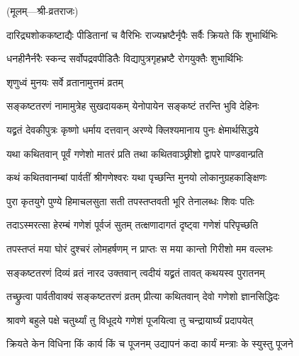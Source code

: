 \centerline{\small{(मूलम्—श्री-व्रतराजः)}}


\twolineshloka
{दारिद्र्यशोककष्टाद्यैः पीडितानां च वैरिभिः}
{राज्यभ्रष्टैर्नृपैः सर्वैः क्रियते किं शुभार्थिभिः} %


\twolineshloka
{धनहीनैर्नरैः स्कन्द सर्वोपद्रवपीडितैः}
{विद्यापुत्रगृहभ्रष्टै रोगयुक्तैः शुभार्थिभिः} %


\onelineshloka
{शृणुध्वं मुनयः सर्वे व्रतानामुत्तमं व्रतम्} %


\twolineshloka
{सङ्कष्टतरणं नामामुत्रेह सुखदायकम्}
{येनोपायेन सङ्कष्टं तरन्ति भुवि देहिनः} %


\twolineshloka
{यद्व्रतं देवकीपुत्रः कृष्णो धर्माय दत्तवान्}
{अरण्ये क्लिश्यमानाय पुनः क्षेमार्थसिद्धये} %


\twolineshloka
{यथा कथितवान् पूर्वं गणेशो मातरं प्रति}
{तथा कथितवाञ्छ्रीशो द्वापरे पाण्डवान्प्रति} %


\twolineshloka
{कथं कथितवानम्बां पार्वतीं श्रीगणेश्वरः}
{यथा पृच्छन्ति मुनयो लोकानुग्रहकाङ्क्षिणः} %


\twolineshloka
{पुरा कृतयुगे पुण्ये हिमाचलसुता सती}
{तपस्तप्तवती भूरि तेनालब्धः शिवः पतिः\footnotemark} %


\twolineshloka
{तदाऽस्मरत्सा हेरम्बं गणेशं पूर्वजं सुतम्}
{तत्क्षणादागतं दृष्ट्वा गणेशं परिपृच्छति} %


\twolineshloka
{तपस्तप्तं मया घोरं दुश्चरं लोमहर्षणम्}
{न प्राप्तः स मया कान्तो गिरीशो मम वल्लभः} %


\twolineshloka
{सङ्कष्टतरणं दिव्यं व्रतं नारद उक्तवान्}
{त्वदीयं यद्व्रतं तावत् कथयस्व पुरातनम्} %


\twolineshloka
{तच्छ्रुत्वा पार्वतीवाक्यं सङ्कष्टतरणं व्रतम्}
{प्रीत्या कथितवान् देवो गणेशो ज्ञानसिद्धिदः} %


\twolineshloka
{श्रावणे बहुले पक्षे चतुर्थ्यां तु विधूदये}
{गणेशं पूजयित्वा तु चन्द्रायार्घ्यं प्रदापयेत्} %


\twolineshloka
{क्रियते केन विधिना किं कार्य किं च पूजनम्}
{उद्यापनं कदा कार्यं मन्त्राः के स्युस्तु पूजने} %

